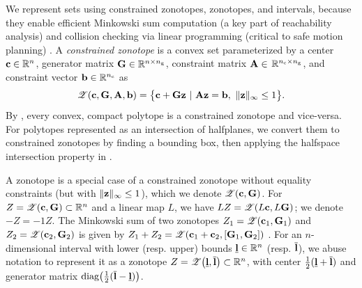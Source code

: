 We represent sets using constrained zonotopes, zonotopes, and intervals, because they enable efficient Minkowski sum computation (a key part of reachability analysis) \cite{althoffphdthesis} and collision checking via linear programming (critical to safe motion planning) \cite{conf:const_zono}.
A \emph{constrained zonotope} \cite{conf:const_zono} is a convex set parameterized by a center ${\mathbf{c}} \in {\mathbb{R}}^n$, generator matrix ${\mathbf{G}} \in {\mathbb{R}}^{n \times {n_{\mathrm{\textnormal{g}}}}}$, constraint matrix ${\mathbf{A}} \in $ ${\mathbb{R}}^{{n_{\mathrm{\textnormal{c}}}} \times {n_{\mathrm{\textnormal{g}}}}}$, and constraint vector ${\mathbf{b}} \in {\mathbb{R}}^{{n_{\mathrm{\textnormal{c}}}}}$ as
\begin{equation}\label{eq:conszono}
    \mathcal{Z}\!\left({\mathbf{c}},{\mathbf{G}},{\mathbf{A}},{\mathbf{b}}\right) = \big\{
        {\mathbf{c}} + {\mathbf{G}}{\mathbf{z}}\ |\ {\mathbf{A}}{\mathbf{z}} = {\mathbf{b}},\ \lVert{\mathbf{z}}\rVert_\infty \leq 1
    \big\}.
\end{equation}
By \cite[Thm. 1]{conf:const_zono}, every convex, compact polytope is a constrained zonotope and vice-versa.
For polytopes represented as an intersection of halfplanes, we convert them to constrained zonotopes by finding a bounding box, then applying the halfspace intersection property in \cite{raghuraman2020set_ops_conzono}.

A zonotope is a special case of a constrained zonotope without equality constraints (but with $\lVert{\mathbf{z}}\rVert_\infty \leq 1$), which we denote $\mathcal{Z}\!\left({\mathbf{c}},{\mathbf{G}}\right)$.
For $Z = \mathcal{Z}\!\left({\mathbf{c}},{\mathbf{G}}\right) \subset {\mathbb{R}}^n$ and a linear map $L$, we have $LZ  = \mathcal{Z}\!\left(L{\mathbf{c}}, L{\mathbf{G}}\right)$; we denote $-Z = -1Z$.
The Minkowski sum of two zonotopes $Z_1 = \mathcal{Z}\!\left({\mathbf{c}}_1,{\mathbf{G}}_1\right)$ and $Z_2 = \mathcal{Z}\!\left({\mathbf{c}}_2,{\mathbf{G}}_2\right)$ is given by $Z_1 + Z_2 = \mathcal{Z}\!\left({\mathbf{c}}_1+{\mathbf{c}}_2,[{\mathbf{G}}_1,{\mathbf{G}}_2]\right)$ \cite{althoffphdthesis}.
For an $n$-dimensional interval with lower (resp. upper) bounds $\underline{{\mathbf{l}}} \in {\mathbb{R}}^n$ (resp. $\overline{{\mathbf{l}}}$), we abuse notation to represent it as a zonotope $Z = \mathcal{Z}\!\left(\underline{{\mathbf{l}}},\overline{{\mathbf{l}}}\right) \subset {\mathbb{R}}^n$, with center $\tfrac{1}{2}(\underline{{\mathbf{l}}}+\overline{{\mathbf{l}}})$ and generator matrix $\mathrm{\textnormal{diag}}\!\left(\tfrac{1}{2}(\overline{{\mathbf{l}}} - \underline{{\mathbf{l}}})\right)$.



